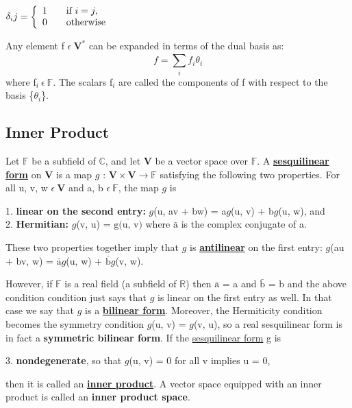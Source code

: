 $\delta_ij = \left\{ 
  \begin{array}{ c l }
    1 & \quad \textrm{if } i=j, \\
    0 & \quad \textrm{otherwise} \\
  \end{array}
\right.$ 

Any element f $\epsilon \: \textbf{V}^ \ast$ can be expanded in terms of the dual basis as:
\begin{equation}
    f = \sum_{i}^{} f_i\theta_i
\end{equation}
where f$_i \: \epsilon \: \mathbb{F}$. The scalars f$_i$ are called the components of f with respect to the
basis \{$\theta_i$\}.

\newpage
\subsection{Inner Product}
Let $\mathbb{F}$ be a subfield of $\mathbb{C}$, and let $\textbf{V}$ be a vector space over $\mathbb{F}$. A \href{https://math.stackexchange.com/questions/2709888/what-is-a-sesquilinear-form}{\textbf{sesquilinear form}}
on $\textbf{V}$ is a map $\textit{g}$ : $\textbf{V} \times \textbf{V} \rightarrow \mathbb{F}$ satisfying the following two properties. For
all u, v, w $\epsilon \: \textbf{V}$ and a, b $\epsilon \: \mathbb{F}$, the map $\textit{g}$ is

1. \textbf{linear on the second entry:} $\textit{g}$(u, av + bw) = a$\textit{g}$(u, v) + b$\textit{g}$(u, w), and \\
2. \textbf{Hermitian:} $\textit{g}$(v, u) = $\overline{\text{g(u, v)}}$
where $\bar{\text{a}}$ is the complex conjugate of a.

These two properties together imply that $\textit{g}$ is \href{https://en.wikipedia.org/wiki/Antilinear_map#:~:text=5%20Citations-,Definitions%20and%20characterizations,is%20called%20conjugate%20homogeneous%20if}{\textbf{antilinear}} on the first entry: $\textit{g}$(au + bv, w) = $\bar{\text{a}}$$\textit{g}$(u, w) + $\bar{\text{b}}$$\textit{g}$(v, w).

However, if $\mathbb{F}$ is a real field (a subfield of $\mathbb{R}$) then $\bar{\text{a}}$ = a and $\bar{\text{b}}$ = b and the above
condition condition just says that $\textit{g}$ is linear on the first entry as well. In that case
we say that $\textit{g}$ is a \href{https://en.wikipedia.org/wiki/Bilinear_form}{\textbf{bilinear form}}. Moreover, the Hermiticity condition becomes
the symmetry condition $\textit{g}$(u, v) = $\textit{g}$(v, u), so a real sesquilinear form is in fact a
\textbf{symmetric bilinear form}. If the \href{https://en.wikipedia.org/wiki/Sesquilinear_form}{sesquilinear form} g is

3. \textbf{nondegenerate}, so that $\textit{g}$(u, v) = 0 for all v implies u = 0,

then it is called an \href{https://math.stackexchange.com/questions/56/what-is-an-inner-product-space}{\textbf{inner product}}. 
A vector space equipped with an inner product is called an \textbf{inner product space}.

\newpage
